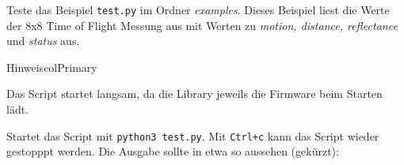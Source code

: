 \documentclass[
  11pt,
  a4paper,
  oneside, openany  ,captions=tableheading
]{scrbook}
\theoremstyle{remark}
\renewcommand{\markright}[1]{\def\chaptertitle{#1}} %
\begin{document}
\markright{Aufgabe 1: Distanzmessung Konsole}

Teste das Beispiel \texttt{test.py} im Ordner \emph{examples}. Dieses
Beispiel liest die Werte der 8x8 Time of Flight Messung aus mit Werten
zu \emph{motion, distance, reflectance} und \emph{status} aus.

\begin{boxtitle}{Hinweis}{colPrimary}

Das Script startet langsam, da die Library jeweils die Firmware beim
Starten lädt.

\end{boxtitle}

Startet das Script mit \texttt{python3\ test.py}. Mit \texttt{Ctrl+c}
kann das Script wieder gestopppt werden. Die Ausgabe sollte in etwa so
aussehen (gekürzt):
\end{document}
